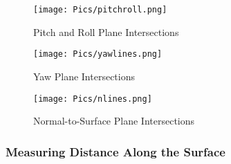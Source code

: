 \begin{figure}[h]
    \centering
    \texttt{[image: Pics/pitchroll.png]}
    \caption{Pitch and Roll Plane Intersections}
    \label{fig:pitchroll}
\end{figure}   
\clearpage
\begin{figure}[H]
    \centering
    \texttt{[image: Pics/yawlines.png]}
    \caption{Yaw Plane Intersections}
    \label{fig:yawplane}
\end{figure}
\begin{figure}[H]
    \centering
    \texttt{[image: Pics/nlines.png]}
    \caption{Normal-to-Surface Plane Intersections}
    \label{fig:nplanes}
\end{figure}
\clearpage

\subsubsection{Measuring Distance Along the Surface}

